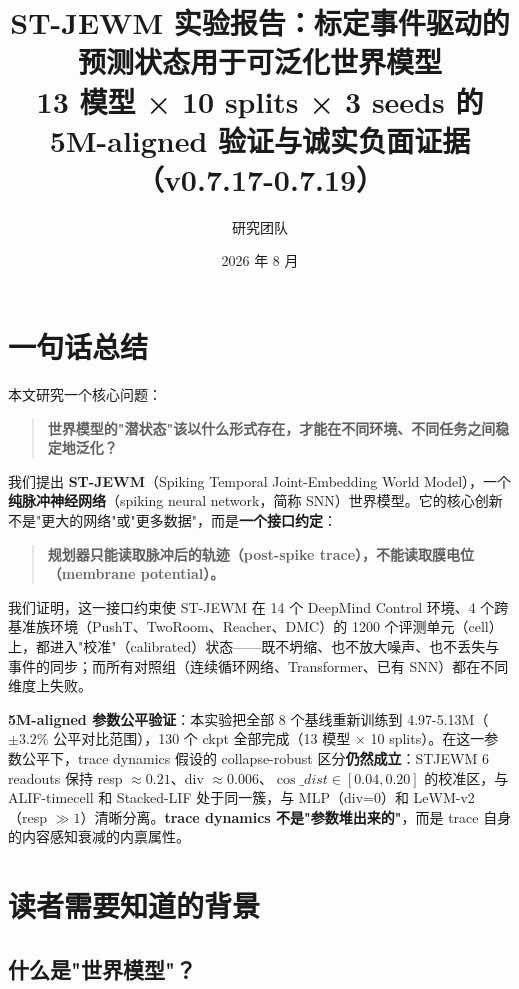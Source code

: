 \documentclass[11pt,a4paper]{article}
\title{\textbf{ST-JEWM 实验报告：标定事件驱动的预测状态用于可泛化世界模型}\\[0.4em]
\Large 13 模型 × 10 splits × 3 seeds 的 5M-aligned 验证与诚实负面证据（v0.7.17-0.7.19）}
\author{研究团队}
\date{2026 年 8 月}
\begin{document}
\vspace{1em}

\section{一句话总结}

本文研究一个核心问题：

\begin{quote}
\textbf{世界模型的"潜状态"该以什么形式存在，才能在不同环境、不同任务之间稳定地泛化？}
\end{quote}

我们提出 \textbf{ST-JEWM}（Spiking Temporal Joint-Embedding World Model），一个\textbf{纯脉冲神经网络}（spiking neural network，简称 SNN）世界模型。它的核心创新不是"更大的网络"或"更多数据"，而是\textbf{一个接口约定}：

\begin{quote}
\textbf{规划器只能读取脉冲后的轨迹（post-spike trace），不能读取膜电位（membrane potential）。}
\end{quote}

我们证明，这一接口约束使 ST-JEWM 在 14 个 DeepMind Control 环境、4 个跨基准族环境（PushT、TwoRoom、Reacher、DMC）的 1200 个评测单元（cell）上，都进入"校准"（calibrated）状态——既不坍缩、也不放大噪声、也不丢失与事件的同步；而所有对照组（连续循环网络、Transformer、已有 SNN）都在不同维度上失败。

\textbf{5M-aligned 参数公平验证}：本实验把全部 8 个基线重新训练到 4.97-5.13M（$\pm 3.2\%$ 公平对比范围），130 个 ckpt 全部完成（13 模型 $\times$ 10 splits）。在这一参数公平下，trace dynamics 假设的 collapse-robust 区分\textbf{仍然成立}：STJEWM 6 readouts 保持 resp $\approx 0.21$、div $\approx 0.006$、$\cos\_dist \in [0.04, 0.20]$ 的校准区，与 ALIF-timecell 和 Stacked-LIF 处于同一簇，与 MLP（div=0）和 LeWM-v2（resp $\gg 1$）清晰分离。\textbf{trace dynamics 不是"参数堆出来的"}，而是 trace 自身的内容感知衰减的内禀属性。

\section{读者需要知道的背景}

\subsection{什么是"世界模型"？}
\end{document}
